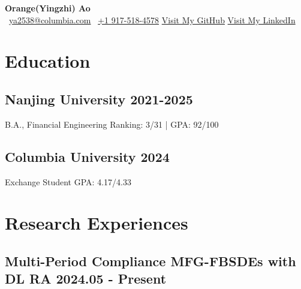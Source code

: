 \documentclass[10.5pt,a4paper]{article}
\newcommand{\org}{\color{org}}
\begin{document}
\begin{center}      
    {\fontsize{25}{25}\selectfont\bfseries Orange(Yingzhi) Ao} \\ \vspace{9pt}
    {\org\faEnvelope[regular]}\ \href{mailto:ya2538@columbia.edu}{ya2538@columbia.com} \hfill
    {\org{}}\ \href{tel:+1 9175184578}{+1 917-518-4578} \hfill
    {\org\faGithub} \href{https://github.com/OrangeAoo}{Visit My GitHub}  \hfill
    {\org\faLinkedin} \href{http://linkedin.com/in/orange-ao}{Visit My LinkedIn}
\end{center}




\section{Education}  %

\subsection{Nanjing University \normalfont \hfill 2021-2025}
B.A., Financial Engineering \hfill Ranking: 3/31 | GPA: 92/100

\subsection{Columbia University  \normalfont \hfill 2024}
Exchange Student \hfill GPA: 4.17/4.33

\section{Research Experiences}  %

\hypertarget{FBSDEs}{
    \subsection{Multi-Period Compliance MFG-FBSDEs with DL \normalfont \hfill RA \hspace{40pt} 2024.05 - Present}}
    
\end{document}
